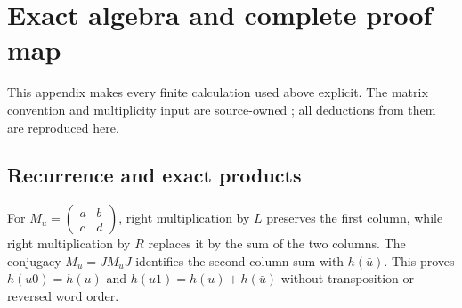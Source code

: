 \section{Exact algebra and complete proof map}
\label{app:proofs}

This appendix makes every finite calculation used above explicit.  The
matrix convention and multiplicity input are source-owned
\citep{knauf1998spin,knauf1999erratum,knauf1993phases}; all deductions from
them are reproduced here.

\subsection{Recurrence and exact products}

For $M_u=\left(\begin{smallmatrix}a&b\\c&d\end{smallmatrix}\right)$,
right multiplication by $L$ preserves the first column, while right
multiplication by $R$ replaces it by the sum of the two columns.  The
conjugacy $M_{\bar u}=JM_uJ$ identifies the second-column sum with
$h(\bar u)$.  This proves
$h(u0)=h(u)$ and $h(u1)=h(u)+h(\bar u)$ without transposition or reversed word
order.

